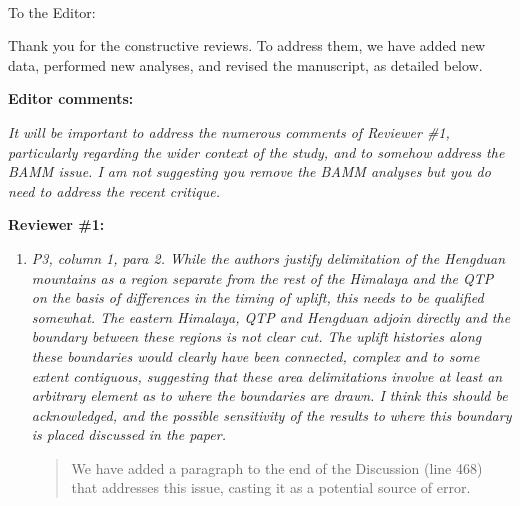 \documentclass[11pt]{letter}
\begin{document}
\raggedright{}


\begin{letter}{ \\

}
\address{Integrative Research Center\\
  The Field Museum\\
  1400 South Lake Shore Drive\\
  Chicago, IL  60605-2496\\
  USA}

\opening{To the Editor:}

Thank you for the constructive reviews. To address them, we have added
new data, performed new analyses, and revised the manuscript, as
detailed below.

\textbf{Editor comments:}

\textit{It will be important to address the numerous comments of
  Reviewer \#1, particularly regarding the wider context of the study,
  and to somehow address the BAMM issue. I am not suggesting you
  remove the BAMM analyses but you do need to address the recent
  critique.}

\textbf{Reviewer \#1:}

\begin{enumerate}
\item \textit{P3, column 1, para 2. While the authors justify
    delimitation of the Hengduan mountains as a region separate from
    the rest of the Himalaya and the QTP on the basis of differences
    in the timing of uplift, this needs to be qualified somewhat. The
    eastern Himalaya, QTP and Hengduan adjoin directly and the
    boundary between these regions is not clear cut. The uplift
    histories along these boundaries would clearly have been
    connected, complex and to some extent contiguous, suggesting that
    these area delimitations involve at least an arbitrary element as
    to where the boundaries are drawn. I think this should be
    acknowledged, and the possible sensitivity of the results to where
    this boundary is placed discussed in the paper.}

\begin{quote}
  We have added a paragraph to the end of the Discussion (line 468)
  that addresses this issue, casting it as a potential source of
  error.
\end{quote}


\end{enumerate}
\end{letter}
\end{document}
